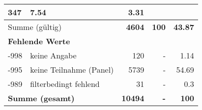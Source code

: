 \begin{longtable}{lXrrr}
       \num{347} &
       \num[round-mode=places,round-precision=2]{7,54} &
         \num[round-mode=places,round-precision=2]{3,31} \\
     \midrule
     \multicolumn{2}{l}{Summe (gültig)} &
       \textbf{\num{4604}} &
     \textbf{100} &
       \textbf{\num[round-mode=places,round-precision=2]{43,87}} \\
     \multicolumn{5}{l}{\textbf{Fehlende Werte}}\\
       -998 &
       keine Angabe &
         \num{120} &
        - &
         \num[round-mode=places,round-precision=2]{1,14} \\
       -995 &
       keine Teilnahme (Panel) &
         \num{5739} &
        - &
         \num[round-mode=places,round-precision=2]{54,69} \\
       -989 &
       filterbedingt fehlend &
         \num{31} &
        - &
         \num[round-mode=places,round-precision=2]{0,3} \\
     \midrule
     \multicolumn{2}{l}{\textbf{Summe (gesamt)}} &
          \textbf{\num{10494}} &
        \textbf{-} &
        \textbf{100} \\
     \bottomrule
     \end{longtable}
     
